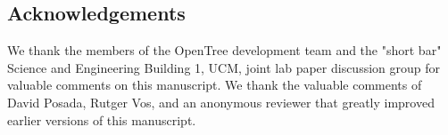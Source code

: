 \documentclass{bmcart}
\begin{document}
\begin{backmatter}
\section*{Acknowledgements}
We thank the members of the OpenTree development team and the "short bar" Science
and Engineering Building 1, UCM, joint lab paper discussion group for valuable
comments on this manuscript. We thank the valuable comments of David Posada, Rutger Vos,
and an anonymous reviewer that greatly improved earlier versions of this manuscript.








\end{backmatter}
\end{document}
